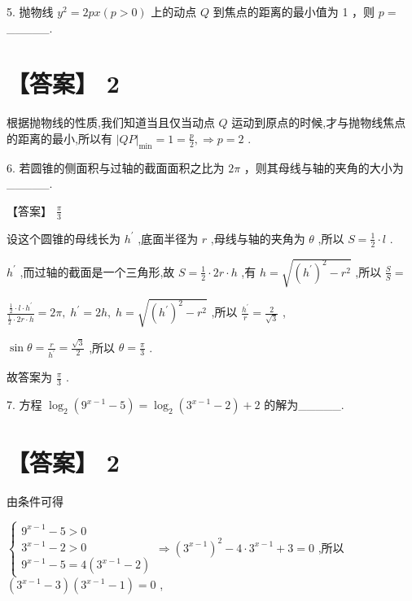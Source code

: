 \documentclass[10pt]{article}
\begin{document}
5. 抛物线 \({y}^{2} = {2px}\left( {p > 0}\right)\) 上的动点 \(Q\) 到焦点的距离的最小值为 1 ，则 \(p =\) \_\_\_\_\_.

\section*{【答案】 2}

根据抛物线的性质,我们知道当且仅当动点 \(Q\) 运动到原点的时候,才与抛物线焦点的距离的最小,所以有 \({\left| QP\right| }_{\min } = 1 = \frac{p}{2}, \Rightarrow  p = 2\) .

6. 若圆锥的侧面积与过轴的截面面积之比为 \({2\pi }\) ，则其母线与轴的夹角的大小为\_\_\_\_\_.

【答案】 \(\frac{\pi }{3}\)

设这个圆锥的母线长为 \({h}^{\prime }\) ,底面半径为 \(r\) ,母线与轴的夹角为 \(\theta\) ,所以 \(S = \frac{1}{2} \cdot  l\) .

\({h}^{\prime }\) ,而过轴的截面是一个三角形,故 \(S = \frac{1}{2} \cdot  {2r} \cdot  h\) ,有 \(h = \sqrt{{\left( {h}^{\prime }\right) }^{2} - {r}^{2}}\) ,所以 \(\frac{S}{S} =\)

\(\frac{\frac{1}{2} \cdot  l \cdot  {h}^{\prime }}{\frac{1}{2} \cdot  {2r} \cdot  h} = {2\pi },\;{h}^{\prime } = {2h},\;h = \sqrt{{\left( {h}^{\prime }\right) }^{2} - {r}^{2}}\) ,所以 \(\frac{{h}^{\prime }}{r} = \frac{2}{\sqrt{3}}\) ,

\(\sin \theta  = \frac{r}{{h}^{\prime }} = \frac{\sqrt{3}}{2}\) ,所以 \(\theta  = \frac{\pi }{3}\) .

故答案为 \(\frac{\pi }{3}\) .

7. 方程 \({\log }_{2}\left( {{9}^{x - 1} - 5}\right)  = {\log }_{2}\left( {{3}^{x - 1} - 2}\right)  + 2\) 的解为\_\_\_\_\_.

\section*{【答案】 2}

由条件可得

\(\left\{  {\begin{array}{l} {9}^{x - 1} - 5 > 0 \\  {3}^{x - 1} - 2 > 0 \\  {9}^{x - 1} - 5 = 4\left( {{3}^{x - 1} - 2}\right)  \end{array} \Rightarrow  {\left( {3}^{x - 1}\right) }^{2} - 4 \cdot  {3}^{x - 1} + 3 = 0}\right.\) ,所以 \(\left( {{3}^{x - 1} - 3}\right) \left( {{3}^{x - 1} - 1}\right)  = 0\) ,
\end{document}
